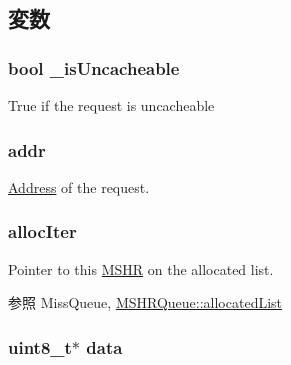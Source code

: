 \subsection{変数}
\hypertarget{classMSHR_a1f29f1c59828a6c0fecd2d33c992c8a4}{
\subsubsection[{\_\-isUncacheable}]{\setlength{\rightskip}{0pt plus 5cm}bool {\bf \_\-isUncacheable}}}
\label{classMSHR_a1f29f1c59828a6c0fecd2d33c992c8a4}
True if the request is uncacheable \hypertarget{classMSHR_a0bb77b4ba61e408313e1118250f9278c}{
\subsubsection[{addr}]{ {\bf addr}}}
\label{classMSHR_a0bb77b4ba61e408313e1118250f9278c}
\hyperlink{classAddress}{Address} of the request. \hypertarget{classMSHR_afd1f01c04c4b2b391083188321ccd47e}{
\subsubsection[{allocIter}]{ {\bf allocIter}}}
\label{classMSHR_afd1f01c04c4b2b391083188321ccd47e}
Pointer to this \hyperlink{classMSHR}{MSHR} on the allocated list. \begin{DoxySeeAlso}{参照}
MissQueue, \hyperlink{classMSHRQueue_a4bac1d00b2059c983d4afaf4df82f4ac}{MSHRQueue::allocatedList} 
\end{DoxySeeAlso}
\hypertarget{classMSHR_abe222f6d3581e7920dcad5306cc906a8}{
\subsubsection[{data}]{\setlength{\rightskip}{0pt plus 5cm}uint8\_\-t$\ast$ {\bf data}}}
\label{classMSHR_abe222f6d3581e7920dcad5306cc906a8}
